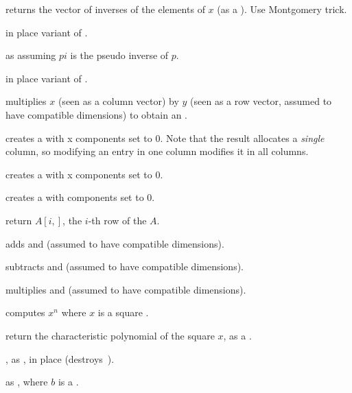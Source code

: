  returns the vector of inverses of the elements
of $x$ (as a ). Use Montgomery trick.

 in place variant of .

 as 
assuming $pi$ is the pseudo inverse of $p$.

 in place variant of
.

 multiplies $x$
(seen as a column vector) by $y$ (seen as a row vector,
assumed to have compatible dimensions) to obtain an .

 creates a  with  x 
components set to $0$. Note that the result allocates a
\emph{single} column, so modifying an entry in one column modifies it in
all columns.

 creates a  with  x
 components set to $0$.

 creates a  with  components set to
$0$.

 return $A[i,]$, the $i$-th row of the
 $A$.

 adds  and 
(assumed to have compatible dimensions).

 subtracts  and 
(assumed to have compatible dimensions).

 multiplies   and 
(assumed to have compatible dimensions).

 computes $x^n$ where $x$ is a
square .

 return the characteristic polynomial of
the square  $x$, as a .



, as , in place
(destroys~).

 as , where $b$ is a
.

